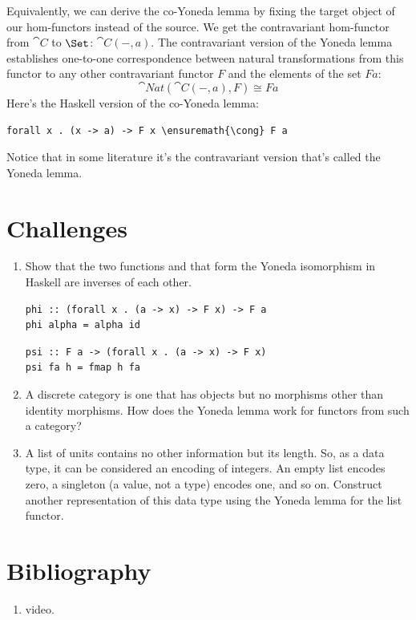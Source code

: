 Equivalently, we can derive the co-Yoneda lemma by fixing the target
object of our hom-functors instead of the source. We get the
contravariant hom-functor from $\cat{C}$ to $\Set$:
$\cat{C}(-, a)$. The contravariant version of the Yoneda lemma
establishes one-to-one correspondence between natural transformations
from this functor to any other contravariant functor $F$ and the
elements of the set $F a$:
\[\cat{Nat}(\cat{C}(-, a), F) \cong F a\]
Here's the Haskell version of the co-Yoneda lemma:

\begin{Verbatim}[commandchars=\\\{\}]
forall x . (x -> a) -> F x \ensuremath{\cong} F a
\end{Verbatim}
Notice that in some literature it's the contravariant version that's
called the Yoneda lemma.

\section{Challenges}

\begin{enumerate}
\tightlist
\item
  Show that the two functions  and  that form
  the Yoneda isomorphism in Haskell are inverses of each other.

\begin{Verbatim}
phi :: (forall x . (a -> x) -> F x) -> F a
phi alpha = alpha id
\end{Verbatim}
\begin{Verbatim}
psi :: F a -> (forall x . (a -> x) -> F x)
psi fa h = fmap h fa
\end{Verbatim}
\item
  A discrete category is one that has objects but no morphisms other
  than identity morphisms. How does the Yoneda lemma work for functors
  from such a category?
\item
  A list of units \code{{[}(){]}} contains no other information but
  its length. So, as a data type, it can be considered an encoding of
  integers. An empty list encodes zero, a singleton \code{{[}(){]}} (a
  value, not a type) encodes one, and so on. Construct another
  representation of this data type using the Yoneda lemma for the list
  functor.
\end{enumerate}

\section{Bibliography}

\begin{enumerate}
\tightlist
\item
   video.
\end{enumerate}